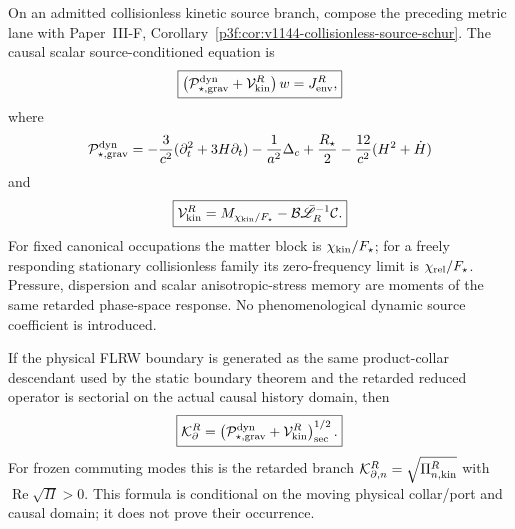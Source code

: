 \documentclass[12pt,a4paper]{article}
\begin{document}
\begin{corollary}
\label{p8:cor:v2145-collisionless-dynamic-source}
On an admitted collisionless kinetic source branch, compose the preceding
metric lane with Paper~III-F,
Corollary~\ref{p3f:cor:v1144-collisionless-source-schur}.  The causal scalar
source-conditioned equation is
\[
 \boxed{
 \left(\mathcal P_{\star,\rm grav}^{\rm dyn}
 +\mathcal V_{\rm kin}^{R}\right)w
 =J_{\rm env}^{R},}
\]
where
\[
 \mathcal P_{\star,\rm grav}^{\rm dyn}
 =-\frac3{c^2}(\partial_t^2+3H\partial_t)
 -\frac1{a^2}\Delta_c
 +\frac{R_\star}{2}
 -\frac{12}{c^2}(H^2+\dot H)
\]
and
\[
 \boxed{
 \mathcal V_{\rm kin}^{R}
 =M_{\chi_{\rm kin}/F_\star}
 -\mathcal B\bar{\mathscr L}_R^{-1}\mathcal C.}
\]
For fixed canonical occupations the matter block is $\chi_{\rm kin}/F_\star$;
for a freely responding stationary collisionless family its zero-frequency
limit is $\chi_{\rm rel}/F_\star$.  Pressure, dispersion and scalar
anisotropic-stress memory are moments of the same retarded phase-space response.
No phenomenological dynamic source coefficient is introduced.
\end{corollary}

\begin{corollary}
\label{p8:cor:v2145-causal-sectorial-dtn}
If the physical FLRW boundary is generated as the same product-collar descendant
used by the static boundary theorem and the retarded reduced operator is
sectorial on the actual causal history domain, then
\[
 \boxed{
 \mathcal K_{\partial}^{R}
 =\left(\mathcal P_{\star,\rm grav}^{\rm dyn}
 +\mathcal V_{\rm kin}^{R}\right)_{\rm sec}^{1/2}.}
\]
For frozen commuting modes this is the retarded branch
$\mathcal K_{\partial,n}^{R}=\sqrt{\Pi_{n,\rm kin}^{R}}$ with
$\operatorname{Re}\sqrt\Pi>0$.  This formula is conditional on the moving
physical collar/port and causal domain; it does not prove their occurrence.
\end{corollary}
\end{document}

